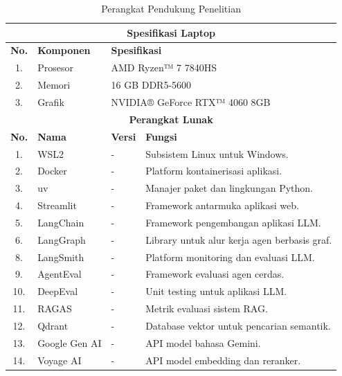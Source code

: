 \begin{table}[H]
    \centering
    \caption{Perangkat Pendukung Penelitian}
    \label{tab:perangkat_pendukung}
    \small
    \begin{tabular}{|c|l|l|p{7cm}|}
    \hline
    \multicolumn{4}{|c|}{\textbf{Spesifikasi Laptop}} \\ \hline
    \textbf{No.} & \textbf{Komponen} & \multicolumn{2}{l|}{\textbf{Spesifikasi}} \\ \hline
    1. & Prosesor & \multicolumn{2}{l|}{AMD Ryzen™ 7 7840HS} \\ \hline
    2. & Memori & \multicolumn{2}{l|}{16 GB DDR5-5600} \\ \hline
    3. & Grafik & \multicolumn{2}{l|}{NVIDIA® GeForce RTX™ 4060 8GB} \\ \hline
    \multicolumn{4}{|c|}{\textbf{Perangkat Lunak}} \\ \hline
    \textbf{No.} & \textbf{Nama} & \textbf{Versi} & \textbf{Fungsi} \\ \hline
    1. & WSL2 & - & Subsistem Linux untuk Windows. \\ \hline
    2. & Docker & - & Platform kontainerisasi aplikasi. \\ \hline
    3. & uv & - & Manajer paket dan lingkungan Python. \\ \hline
    4. & Streamlit & - & Framework antarmuka aplikasi web. \\ \hline
    5. & LangChain & - & Framework pengembangan aplikasi LLM. \\ \hline
    6. & LangGraph & - & Library untuk alur kerja agen berbasis graf. \\ \hline
    8. & LangSmith & - & Platform monitoring dan evaluasi LLM. \\ \hline
    9. & AgentEval & - & Framework evaluasi agen cerdas. \\ \hline
    10. & DeepEval & - & Unit testing untuk aplikasi LLM. \\ \hline
    11. & RAGAS & - & Metrik evaluasi sistem RAG. \\ \hline
    12. & Qdrant & - & Database vektor untuk pencarian semantik. \\ \hline
    13. & Google Gen AI & - & API model bahasa Gemini. \\ \hline
    14. & Voyage AI & - & API model embedding dan reranker. \\ \hline
    \end{tabular}
\end{table}

